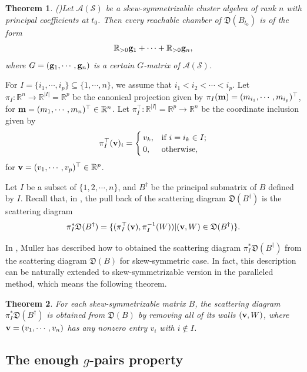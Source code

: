 \documentclass[14pt]{amsart}
\newtheorem{Theorem}{Theorem}[section]
\begin{document}
\begin{Theorem} (\cite[Lemma 2.10]{GHKK})\label{thmgvectors}
Let  $\mathcal A(\mathcal S)$ be a skew-symmetrizable cluster algebra of rank $n$ with principal coefficients at $t_0$. Then every reachable chamber of $\mathfrak D(B_{t_0})$ is of the form $$\mathbb R_{>0}{\bf g}_1+\cdots+\mathbb R_{>0}{\bf g}_n,$$
where $G=({\bf g}_1,\cdots,{\bf g}_n)$ is a certain $G$-matrix of $\mathcal A(\mathcal S)$.
\end{Theorem}


  For $I=\{i_1,\cdots,i_p\}\subseteq\{1,\cdots,n\}$, we assume that $i_1<i_2<\cdots<i_p$. Let $\pi_I: \mathbb R^n\rightarrow \mathbb R^{|I|}=\mathbb R^{p}$ be the  canonical projection given by
$\pi_I({\bf m})=(m_{i_1},\cdots,m_{i_p})^{\top}$, for ${\bf m}=(m_1,\cdots,m_n)^{\top}\in\mathbb R^n$.
 Let $\pi_I^{\top}: \mathbb R^{|I|}=\mathbb R^{p}\rightarrow \mathbb R^n$ be the coordinate inclusion given by $$\pi_I^{\top}({\bf v})_i=\begin{cases} v_{k},&\text{if }i =i_k\in I;\\0,& \text{otherwise},\end{cases}$$
 for ${\bf v}=(v_1,\cdots,v_p)^{\top}\in\mathbb R^p$.

Let $I$ be a subset of $\{1,2,\cdots,n\}$, and $B^\dag$ be the principal submatrix  of $B$ defined by $I$. Recall that, in \cite{M}, the pull back of the scattering diagram $\mathfrak D(B^\dag)$ is the scattering diagram
$$\pi_I^{\ast}\mathfrak D(B^\dag)=\{(\pi_I^{\top}( {\bf v}), \pi_I^{-1}(W))|({\bf v},W)\in \mathfrak D(B^\dag)\}.$$

In \cite[Theorem 33]{M}, Muller has described how to obtained the scattering diagram $\pi_I^{\ast}\mathfrak D(B^\dag)$ from the scattering diagram $\mathfrak D(B)$ for skew-symmetric case. In fact, this description can be naturally extended to skew-symmetrizable  version in the paralleled method, which means the following theorem.
\begin{Theorem}\label{thmpullback}
 For each  skew-symmetrizable matrix $B$, the scattering diagram $\pi_I^{\ast}\mathfrak D(B^\dag)$
is obtained from $\mathfrak D(B)$ by removing all of its walls $({\bf v}, W)$, where ${\bf v}=(v_1,\cdots,v_n)$ has any nonzero entry $v_i$ with $i\notin I$.
\end{Theorem}

\subsection{The enough $g$-pairs property}
\end{document}
